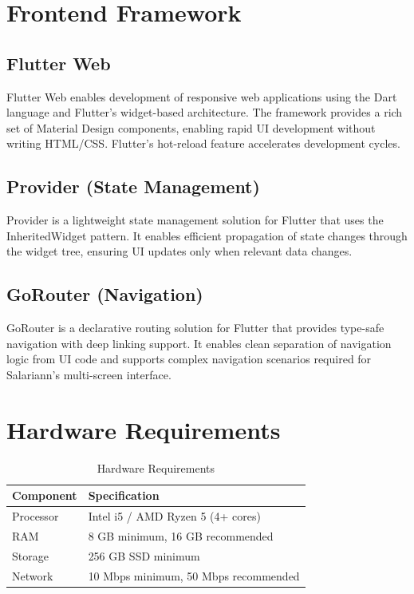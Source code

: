 \documentclass[12pt,a4paper,oneside]{report}
\begin{document}
\section{Frontend Framework}

\subsection{Flutter Web}

Flutter Web enables development of responsive web applications using the Dart language and Flutter's widget-based architecture. The framework provides a rich set of Material Design components, enabling rapid UI development without writing HTML/CSS. Flutter's hot-reload feature accelerates development cycles.

\subsection{Provider (State Management)}

Provider is a lightweight state management solution for Flutter that uses the InheritedWidget pattern. It enables efficient propagation of state changes through the widget tree, ensuring UI updates only when relevant data changes.

\subsection{GoRouter (Navigation)}

GoRouter is a declarative routing solution for Flutter that provides type-safe navigation with deep linking support. It enables clean separation of navigation logic from UI code and supports complex navigation scenarios required for Salariann's multi-screen interface.

\section{Hardware Requirements}

\begin{table}[H]
\centering
\caption{Hardware Requirements}
\label{tab:hardware}
\begin{tabular}{|l|l|}
\hline
\textbf{Component} & \textbf{Specification} \\
\hline
Processor & Intel i5 / AMD Ryzen 5 (4+ cores) \\
\hline
RAM & 8 GB minimum, 16 GB recommended \\
\hline
Storage & 256 GB SSD minimum \\
\hline
Network & 10 Mbps minimum, 50 Mbps recommended \\
\hline
\end{tabular}
\end{table}
\end{document}

